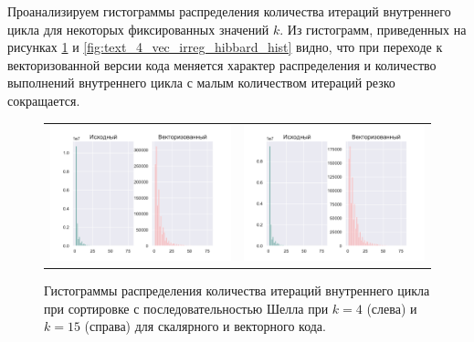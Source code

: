 Проанализируем гистограммы распределения количества итераций внутреннего цикла для некоторых фиксированных значений $k$.
Из гистограмм, приведенных на рисунках \ref{fig:text_4_vec_irreg_shell_hist} и \ref{fig:text_4_vec_irreg_hibbard_hist} видно, что при переходе к векторизованной версии кода меняется характер распределения и количество выполнений внутреннего цикла с малым количеством итераций резко сокращается.

\begin{figure}[ht]
\centering
\begin{tabular}{ll}
\includegraphics[scale=0.5]{./pics/text_4_vec_irreg/shell_k_4.pdf}
&
\includegraphics[scale=0.5]{./pics/text_4_vec_irreg/shell_k_15.pdf}
\end{tabular}
\singlespacing
{}\caption{Гистограммы распределения количества итераций внутреннего цикла при сортировке с последовательностью
Шелла при $k = 4$ (слева) и $k = 15$ (справа) для скалярного и векторного кода.}
\label{fig:text_4_vec_irreg_shell_hist}
\end{figure}

